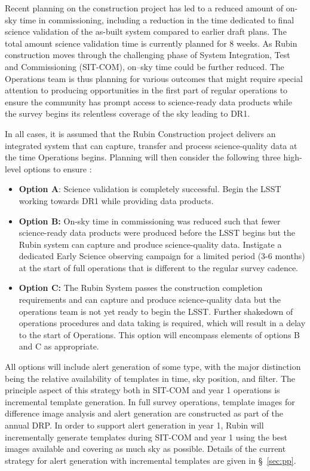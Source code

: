 Recent planning on the construction project has led to a reduced amount of on-sky time in commissioning, including a reduction in the time dedicated to final science validation of the as-built system compared to earlier draft plans.
The total amount science validation time is currently planned for 8 weeks.
As Rubin construction moves through the challenging phase of System Integration, Test and Commissioning (SIT-COM), on--sky time could be further reduced. 
The Operations team is thus planning for various outcomes that might require special attention to producing \es opportunities in the first part of regular operations to ensure the community has prompt access to science-ready data products while the survey begins its relentless coverage of the sky leading to DR1.

In all cases, it is assumed that the Rubin Construction project delivers an integrated system that can capture, transfer and process science-quality data at the time Operations begins.
Planning will then consider the following three high-level options to ensure \es:
\begin{itemize}
\item \textbf{Option A}: 
Science validation is completely successful.
Begin the LSST working towards DR1 while providing \es data products. 
\item \textbf{Option B:} 
On-sky time in commissioning was reduced such that fewer science-ready data products were produced before the LSST begins but the Rubin system can capture and produce science-quality data. 
Instigate a dedicated Early Science observing campaign for a limited period (3-6 months) at the start of full operations that is different to the regular survey cadence. 
\item \textbf{Option C:} 
The Rubin System  passes the construction completion requirements and can capture and produce science-quality data but the operations team is not yet ready to begin the LSST. 
Further shakedown of operations procedures and data taking is required, which will result in a delay to the start of Operations. 
This option will encompass elements of options B and C as appropriate. 
\end{itemize}

All options will include alert generation of some type, with the major distinction being the relative availability of templates in time, sky position, and filter. 
The principle aspect of this strategy both  in SIT-COM and year 1 operations is incremental template generation. 
In full survey operations, template images for difference image analysis and alert generation are constructed as part of the annual DRP. 
In order to support alert generation in year 1, Rubin will incrementally generate templates during SIT-COM and year 1 using the best images available and covering as much sky as possible. 
Details of the current strategy for alert generation  with incremental templates are given in  \S~\ref{sec:pp}.  

